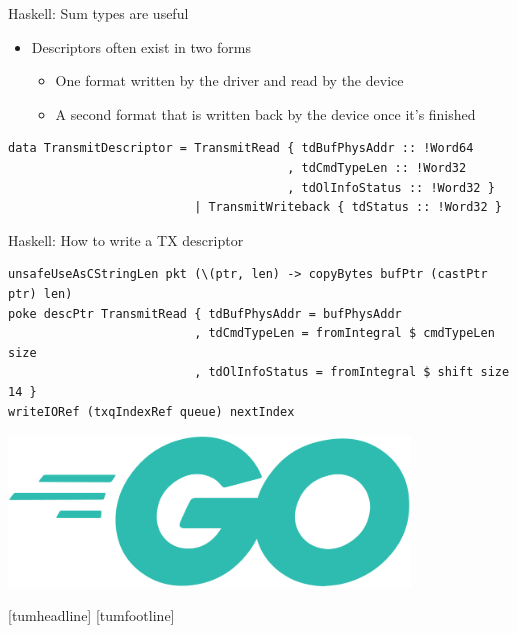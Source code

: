 \documentclass[NET,english,aspectratio=169,notitleframe]{tumbeamer}
\begin{document}
\begin{frame}[fragile]{Haskell: Sum types are useful}
\begin{itemize}
\item Descriptors often exist in two forms
\begin{itemize}
\item One format written by the driver and read by the device
\item A second format that is written back by the device once it's finished
\end{itemize}
\end{itemize}
\begin{verbatim}
data TransmitDescriptor = TransmitRead { tdBufPhysAddr :: !Word64
                                       , tdCmdTypeLen :: !Word32
                                       , tdOlInfoStatus :: !Word32 }
                          | TransmitWriteback { tdStatus :: !Word32 }
\end{verbatim}
\end{frame}


\begin{frame}[fragile]{Haskell: How to write a TX descriptor}
\begin{verbatim}
unsafeUseAsCStringLen pkt (\(ptr, len) -> copyBytes bufPtr (castPtr ptr) len)
poke descPtr TransmitRead { tdBufPhysAddr = bufPhysAddr 
                          , tdCmdTypeLen = fromIntegral $ cmdTypeLen size
                          , tdOlInfoStatus = fromIntegral $ shift size 14 }
writeIORef (txqIndexRef queue) nextIndex
\end{verbatim}
\end{frame}




\begin{frame}{}
\centering\includegraphics[width=0.8\textwidth]{pics/go}
\end{frame}
[tumheadline]
[tumfootline]
\end{document}
